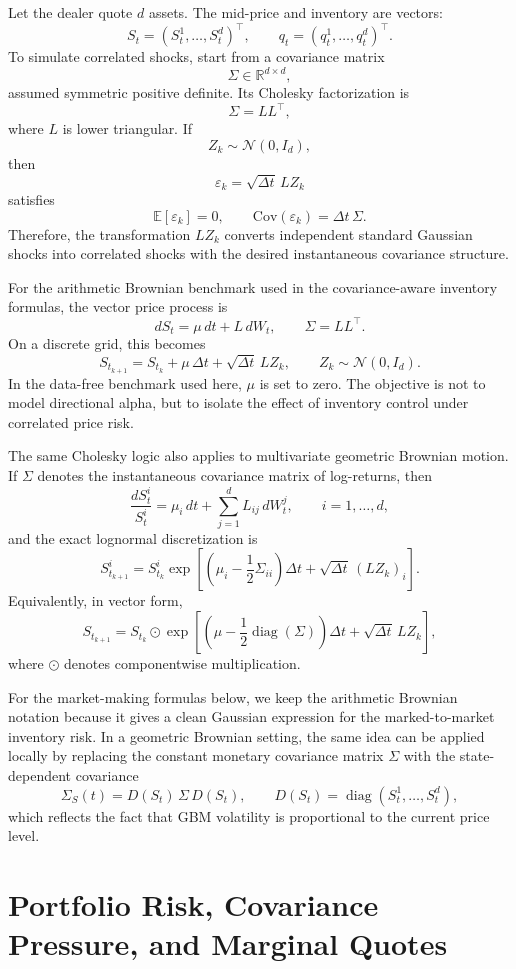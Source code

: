 \documentclass[a4paper,10pt,titlepage,oneside,openany]{book}
\theoremstyle{plain}\newtheorem{theorem}{Theorem}[chapter]
\theoremstyle{definition}\newtheorem{definition}{Definition}[chapter]
\theoremstyle{remark}\newtheorem{remark}{Remark}[chapter]
\begin{document}
Let the dealer quote $d$ assets. The mid-price and inventory are vectors:
\[
S_t=(S_t^1,\ldots,S_t^d)^\top,\qquad
q_t=(q_t^1,\ldots,q_t^d)^\top .
\]
To simulate correlated shocks, start from a covariance matrix
\[
\Sigma\in\mathbb{R}^{d\times d},
\]
assumed symmetric positive definite. Its Cholesky factorization is
\[
\Sigma=LL^\top,
\]
where $L$ is lower triangular. If
\[
Z_k\sim\mathcal{N}(0,I_d),
\]
then
\[
\varepsilon_k=\sqrt{\Delta t}\,LZ_k
\]
satisfies
\[
\mathbb{E}[\varepsilon_k]=0,
\qquad
\mathrm{Cov}(\varepsilon_k)=\Delta t\,\Sigma .
\]
Therefore, the transformation $LZ_k$ converts independent standard Gaussian shocks into correlated shocks with the desired instantaneous covariance structure.

For the arithmetic Brownian benchmark used in the covariance-aware inventory formulas, the vector price process is
\[
dS_t=\mu\,dt+L\,dW_t,
\qquad
\Sigma=LL^\top.
\]
On a discrete grid, this becomes
\[
S_{t_{k+1}}=S_{t_k}+\mu\,\Delta t+\sqrt{\Delta t}\,LZ_k,
\qquad
Z_k\sim\mathcal{N}(0,I_d).
\]
In the data-free benchmark used here, $\mu$ is set to zero. The objective is not to model directional alpha, but to isolate the effect of inventory control under correlated price risk.

The same Cholesky logic also applies to multivariate geometric Brownian motion. If $\Sigma$ denotes the instantaneous covariance matrix of log-returns, then
\[
\frac{dS_t^i}{S_t^i}
=
\mu_i\,dt+\sum_{j=1}^{d}L_{ij}\,dW_t^j,
\qquad i=1,\ldots,d,
\]
and the exact lognormal discretization is
\[
S_{t_{k+1}}^i
=
S_{t_k}^i
\exp\!\left[
\left(\mu_i-\frac{1}{2}\Sigma_{ii}\right)\Delta t
+
\sqrt{\Delta t}\,(LZ_k)_i
\right].
\]
Equivalently, in vector form,
\[
S_{t_{k+1}}
=
S_{t_k}\odot
\exp\!\left[
\left(\mu-\frac{1}{2}\operatorname{diag}(\Sigma)\right)\Delta t
+
\sqrt{\Delta t}\,LZ_k
\right],
\]
where $\odot$ denotes componentwise multiplication.

For the market-making formulas below, we keep the arithmetic Brownian notation because it gives a clean Gaussian expression for the marked-to-market inventory risk. In a geometric Brownian setting, the same idea can be applied locally by replacing the constant monetary covariance matrix $\Sigma$ with the state-dependent covariance
\[
\Sigma_S(t)
=
D(S_t)\,\Sigma\,D(S_t),
\qquad
D(S_t)=\operatorname{diag}(S_t^1,\ldots,S_t^d),
\]
which reflects the fact that GBM volatility is proportional to the current price level.

\section{Portfolio Risk, Covariance Pressure, and Marginal Quotes}
\end{document}
